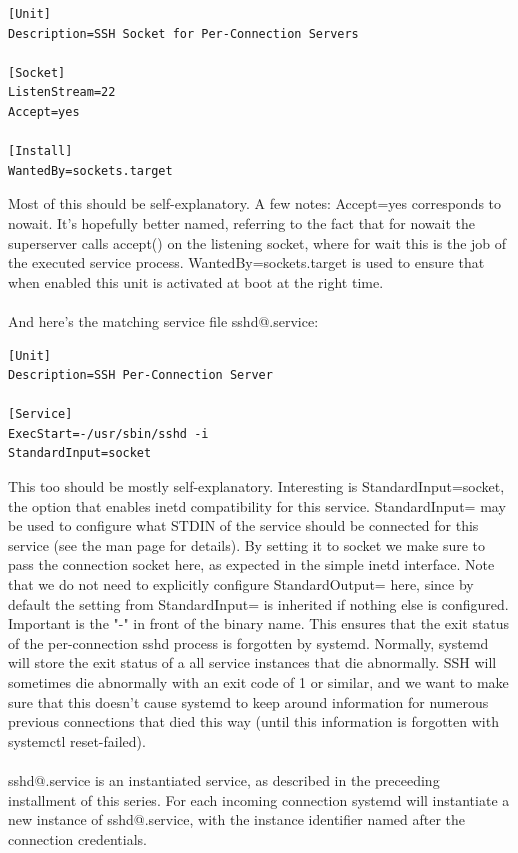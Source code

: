 \documentclass[titlepage]{article}
\begin{document}
\begin{lstlisting}
[Unit]
Description=SSH Socket for Per-Connection Servers

[Socket]
ListenStream=22
Accept=yes

[Install]
WantedBy=sockets.target
\end{lstlisting}
Most of this should be self-explanatory. A few notes: Accept=yes corresponds to nowait. It's hopefully better named, referring to the fact that for nowait the superserver calls accept() on the listening socket, where for wait this is the job of the executed service process. WantedBy=sockets.target is used to ensure that when enabled this unit is activated at boot at the right time.
\\
\\
And here's the matching service file sshd@.service:
\begin{lstlisting}
[Unit]
Description=SSH Per-Connection Server

[Service]
ExecStart=-/usr/sbin/sshd -i
StandardInput=socket
\end{lstlisting}
This too should be mostly self-explanatory. Interesting is StandardInput=socket, the option that enables inetd compatibility for this service. StandardInput= may be used to configure what STDIN of the service should be connected for this service (see the man page for details). By setting it to socket we make sure to pass the connection socket here, as expected in the simple inetd interface. Note that we do not need to explicitly configure StandardOutput= here, since by default the setting from StandardInput= is inherited if nothing else is configured. Important is the "-" in front of the binary name. This ensures that the exit status of the per-connection sshd process is forgotten by systemd. Normally, systemd will store the exit status of a all service instances that die abnormally. SSH will sometimes die abnormally with an exit code of 1 or similar, and we want to make sure that this doesn't cause systemd to keep around information for numerous previous connections that died this way (until this information is forgotten with systemctl reset-failed).
\\
\\
sshd@.service is an instantiated service, as described in the preceeding installment of this series. For each incoming connection systemd will instantiate a new instance of sshd@.service, with the instance identifier named after the connection credentials.
\\
\\
\end{document}
